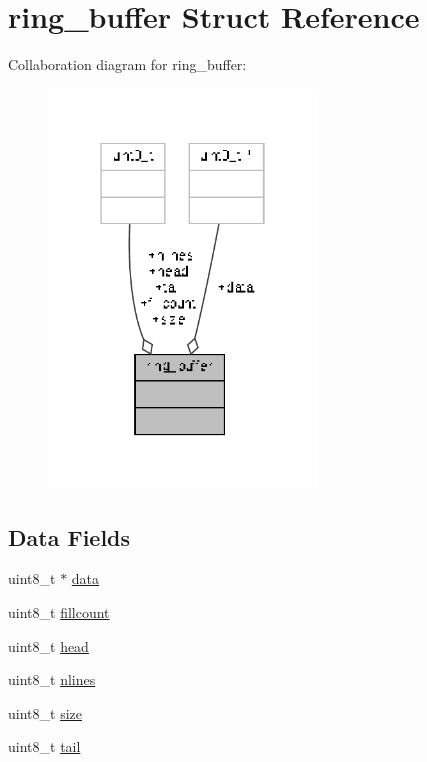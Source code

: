 \hypertarget{structring__buffer}{\section{ring\-\_\-buffer Struct Reference}
\label{structring__buffer}
}


Collaboration diagram for ring\-\_\-buffer\-:
\nopagebreak
\begin{figure}[H]
\begin{center}
\leavevmode
\includegraphics[width=202pt]{structring__buffer__coll__graph}
\end{center}
\end{figure}
\subsection*{Data Fields}
\begin{DoxyCompactItemize}
\item 
uint8\-\_\-t $\ast$ \hyperlink{structring__buffer_afd2830d5078005b02a9621169c6cf1f4}{data}
\item 
uint8\-\_\-t \hyperlink{structring__buffer_abf5dc043ad613d205133e0800570fec2}{fillcount}
\item 
uint8\-\_\-t \hyperlink{structring__buffer_af1343044f173745cd6b3d70b10a3c5bb}{head}
\item 
uint8\-\_\-t \hyperlink{structring__buffer_aafdca1edc68f0b8080f87d0b3a64e62e}{nlines}
\item 
uint8\-\_\-t \hyperlink{structring__buffer_afc24f89ba4a6c5783a381e2a10fcbedd}{size}
\item 
uint8\-\_\-t \hyperlink{structring__buffer_ab0f9f0c2eae533546f76d08b39a71fc8}{tail}
\end{DoxyCompactItemize}


